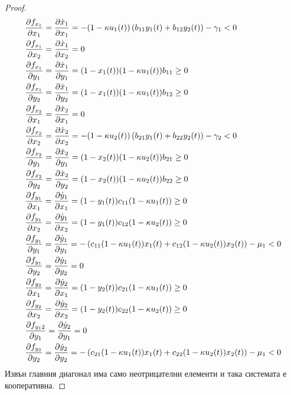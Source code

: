 \begin{proof}
  \label{eq:JacobianElements}
  \begin{equation}
    \begin{split}
      &\pdv{f_{x_1}}{x_1} = \pdv{\dot{x}_1}{x_1} = -(1-\kappa u_1(t)) \left(b_{11} y_1(t) + b_{12} y_2(t)\right) - \gamma_1 < 0 \\
      &\pdv{f_{x_1}}{x_2} = \pdv{\dot{x}_1}{x_2} = 0 \\
      &\pdv{f_{x_1}}{y_1} = \pdv{\dot{x}_1}{y_1} = (1-x_1(t)) (1-\kappa u_1(t)) b_{11} \geq 0 \\
      &\pdv{f_{x_1}}{y_2} = \pdv{\dot{x}_1}{y_2} = (1-x_1(t)) (1-\kappa u_1(t)) b_{12} \geq 0 \\
      &\pdv{f_{x_2}}{x_1} = \pdv{\dot{x}_2}{x_1} = 0 \\
      &\pdv{f_{x_2}}{x_2} = \pdv{\dot{x}_2}{x_2} = -(1-\kappa u_2(t)) \left(b_{21} y_1(t) + b_{22} y_2(t)\right) - \gamma_2 < 0 \\
      &\pdv{f_{x_2}}{y_1} = \pdv{\dot{x}_2}{y_1} = (1-x_2(t)) (1-\kappa u_2(t)) b_{21} \geq 0 \\
      &\pdv{f_{x_2}}{y_2} = \pdv{\dot{x}_2}{y_2} = (1-x_2(t)) (1-\kappa u_2(t)) b_{22} \geq 0 \\
      &\pdv{f_{y_1}}{x_1} = \pdv{\dot{y}_1}{x_1} = (1-y_1(t)) c_{11}(1-\kappa u_1(t)) \geq 0 \\
      &\pdv{f_{y_1}}{x_2} = \pdv{\dot{y}_1}{x_2} = (1-y_1(t)) c_{12}(1-\kappa u_2(t)) \geq 0 \\
      &\pdv{f_{y_1}}{y_1} = \pdv{\dot{y}_1}{y_1} = -\left(c_{11}(1-\kappa u_1(t)) x_1(t) + c_{12}(1-\kappa u_2(t)) x_2(t)\right) - \mu_1 < 0 \\
      &\pdv{f_{y_1}}{y_2} = \pdv{\dot{y}_1}{y_2} = 0 \\
      &\pdv{f_{y_2}}{x_1} = \pdv{\dot{y}_2}{x_1} = (1-y_2(t)) c_{21}(1-\kappa u_1(t)) \geq 0 \\
      &\pdv{f_{y_2}}{x_2} = \pdv{\dot{y}_2}{x_2} = (1-y_2(t)) c_{22}(1-\kappa u_2(t)) \geq 0 \\
      &\pdv{f_{y_12}}{y_1} = \pdv{\dot{y}_2}{y_1} = 0 \\
      &\pdv{f_{y_2}}{y_2} = \pdv{\dot{y}_2}{y_2} = -\left(c_{21}(1-\kappa u_1(t)) x_1(t) + c_{22}(1-\kappa u_2(t)) x_2(t)\right) - \mu_1 < 0
    \end{split}
    \end{equation}
  Извън главния диагонал има само неотрицателни елементи и така системата е кооперативна.
\end{proof}


